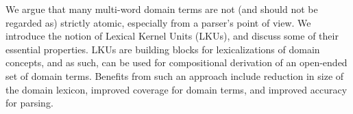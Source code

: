 We argue that many multi-word domain terms are not (and should not be regarded as) strictly atomic, especially from a parser's point of view.  We introduce the notion of Lexical Kernel Units (LKUs), and discuss some of their essential properties. LKUs are building blocks for lexicalizations of domain concepts, and as such, can be used for compositional derivation of an open-ended set of domain terms.              Benefits from such an approach include reduction in size of the domain lexicon, improved coverage for domain terms, and improved accuracy for parsing.
